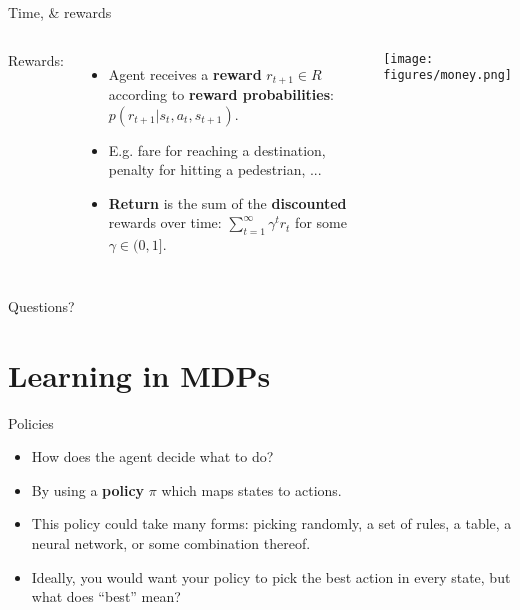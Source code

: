 \documentclass{beamer}
\begin{document}
\begin{frame}{Time, \& rewards}
\begin{columns}
Rewards:
\begin{itemize}
    \item Agent receives a \textbf{reward} \(r_{t+1} \in R\) according to \textbf{reward probabilities}: \(p(r_{t+1} | s_t, a_t, s_{t+1})\). 
    \item<2-> E.g. fare for reaching a destination, penalty for hitting a pedestrian, ...
    \item<3-> \textbf{Return} is the sum of the \textbf{discounted} rewards over time: \(\sum_{t=1}^\infty \gamma^t r_t\) for some \(\gamma \in (0, 1]\).
\end{itemize}
    \begin{center}
    \texttt{[image: figures/money.png]}
    \end{center}
\end{columns}
\end{frame}


\begin{frame}[standout]
Questions?
\end{frame}

\section{Learning in MDPs}
\begin{frame}{Policies}
\begin{itemize}
\item How does the agent decide what to do?
\item<2-> By using a \textbf{policy} \(\pi\) which maps states to actions.
\item<3-> This policy could take many forms: picking randomly, a set of rules, a table, a neural network, or some combination thereof.
\item<4-> Ideally, you would want your policy to pick the best action in every state, but what does ``best'' mean?
\end{itemize}
\end{frame}
\end{document}
